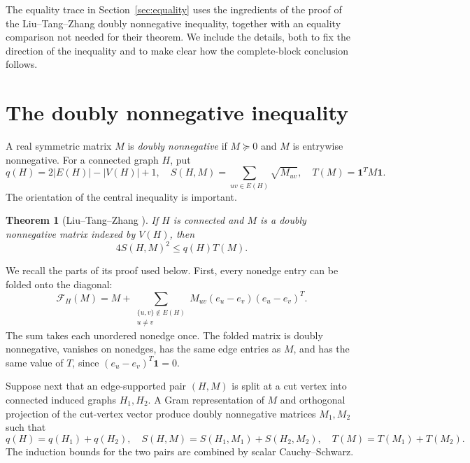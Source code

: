 \documentclass[11pt]{article}
\newtheorem{theorem}{Theorem}
\theoremstyle{remark}
\newcommand{\one}{\mathbf 1}
\begin{document}
The equality trace in Section~\ref{sec:equality} uses the ingredients of the
proof of the Liu--Tang--Zhang doubly nonnegative inequality, together with an
equality comparison not needed for their theorem.  We include the details,
both to fix the direction of the inequality and to make clear how the
complete-block conclusion follows.

\section{The doubly nonnegative inequality}\label{sec:dnn}

A real symmetric matrix $M$ is \emph{doubly nonnegative} if $M\succeq0$ and
$M$ is entrywise nonnegative.  For a connected graph $H$, put
\[
 q(H)=2|E(H)|-|V(H)|+1,
 \quad
 S(H,M)=\sum_{uv\in E(H)}\sqrt{M_{uv}},
 \quad
 T(M)=\one^TM\one.
\]
The orientation of the central inequality is important.

\begin{theorem}[Liu--Tang--Zhang \cite{LTZ}]\label{thm:ltz}
If $H$ is connected and $M$ is a doubly nonnegative matrix indexed by
$V(H)$, then
\begin{equation}\label{eq:ltz}
 4S(H,M)^2\leq q(H)T(M).
\end{equation}
\end{theorem}

We recall the parts of its proof used below.  First, every nonedge entry can
be folded onto the diagonal:
\begin{equation}\label{eq:fold}
 \mathcal F_H(M)=M+
 \sum_{\substack{\{u,v\}\notin E(H)\\u\ne v}}
 M_{uv}(e_u-e_v)(e_u-e_v)^T.
\end{equation}
The sum takes each unordered nonedge once.  The folded matrix is doubly
nonnegative, vanishes on nonedges, has the same edge entries as $M$, and has
the same value of $T$, since $(e_u-e_v)^T\one=0$.

Suppose next that an edge-supported pair $(H,M)$ is split at a cut vertex
into connected induced graphs $H_1,H_2$.  A Gram representation of $M$ and
orthogonal projection of the cut-vertex vector produce doubly nonnegative
matrices $M_1,M_2$ such that
\begin{equation}\label{eq:cut-add}
 q(H)=q(H_1)+q(H_2),\quad
 S(H,M)=S(H_1,M_1)+S(H_2,M_2),\quad
 T(M)=T(M_1)+T(M_2).
\end{equation}
The induction bounds for the two pairs are combined by scalar
Cauchy--Schwarz.
\end{document}
